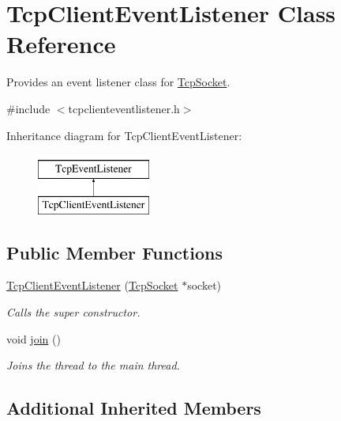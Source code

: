 \hypertarget{class_tcp_client_event_listener}{}\section{Tcp\+Client\+Event\+Listener Class Reference}
\label{class_tcp_client_event_listener}


Provides an event listener class for \mbox{\hyperlink{class_tcp_socket}{Tcp\+Socket}}.  




{\ttfamily \#include $<$tcpclienteventlistener.\+h$>$}

Inheritance diagram for Tcp\+Client\+Event\+Listener\+:\begin{figure}[H]
\begin{center}
\leavevmode
\includegraphics[height=2.000000cm]{class_tcp_client_event_listener}
\end{center}
\end{figure}
\subsection*{Public Member Functions}
\begin{DoxyCompactItemize}
\item 
\mbox{\hyperlink{class_tcp_client_event_listener_aec59e53888849d543205bc501743e2ab}{Tcp\+Client\+Event\+Listener}} (\mbox{\hyperlink{class_tcp_socket}{Tcp\+Socket}} $\ast$socket)
\begin{DoxyCompactList}\small\item\em Calls the super constructor. \end{DoxyCompactList}\item 
\mbox{\label{class_tcp_client_event_listener_a6ca2691fe23a24f538e02c1a3db3efc7}} 
void \mbox{\hyperlink{class_tcp_client_event_listener_a6ca2691fe23a24f538e02c1a3db3efc7}{join}} ()
\begin{DoxyCompactList}\small\item\em Joins the thread to the main thread. \end{DoxyCompactList}\end{DoxyCompactItemize}
\subsection*{Additional Inherited Members}


